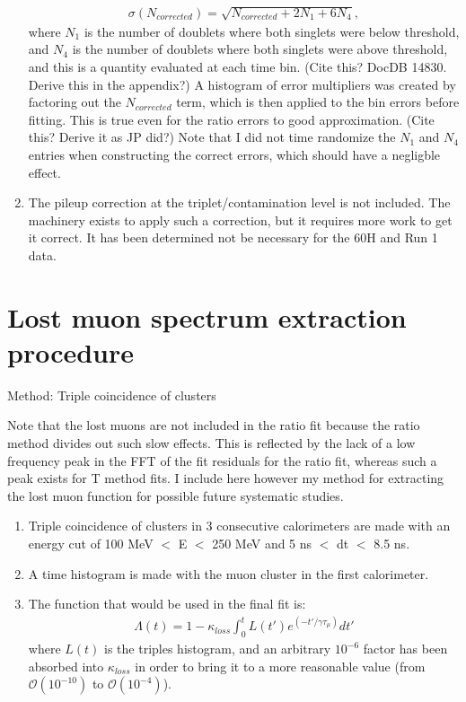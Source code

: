 \begin{enumerate}
{			\begin{gather}
				\sigma(N_{corrected}) = \sqrt{N_{corrected} + 2 N_{1} + 6 N_{4}},
			\end{gather}
		where $N_{1}$ is the number of doublets where both singlets were below threshold, and $N_{4}$ is the number of doublets where both singlets were above threshold, and this is a quantity evaluated at each time bin. (Cite this? DocDB 14830. Derive this in the appendix?) A histogram of error multipliers was created by factoring out the $N_{corrected}$ term, which is then applied to the bin errors before fitting. This is true even for the ratio errors to good approximation. (Cite this? Derive it as JP did?) Note that I did not time randomize the $N_{1}$ and $N_{4}$ entries when constructing the correct errors, which should have a negligble effect.}
		\item{The pileup correction at the triplet/contamination level is not included. The machinery exists to apply such a correction, but it requires more work to get it correct. It has been determined not be necessary for the 60H and Run 1 data.}
	\end{enumerate}


\section{Lost muon spectrum extraction procedure}
\label{Sec:LM}

	Method: Triple coincidence of clusters

	Note that the lost muons are not included in the ratio fit because the ratio method divides out such slow effects. This is reflected by the lack of a low frequency peak in the FFT of the fit residuals for the ratio fit, whereas such a peak exists for T method fits. I include here however my method for extracting the lost muon function for possible future systematic studies.

	\begin{enumerate}
		\item{Triple coincidence of clusters in 3 consecutive calorimeters are made with an energy cut of 100 MeV $<$ E $<$ 250 MeV and 5 ns $<$ dt $<$ 8.5 ns.}
		\item{A time histogram is made with the muon cluster in the first calorimeter.}
		\item{The function that would be used in the final fit is:
			\begin{gather}
				\Lambda(t) = 1 - \kappa_{loss} \int_{0}^{t} L(t')e^{(-t'/\gamma\tau_{\mu})} dt'
			\end{gather}
		where $L(t)$ is the triples histogram, and an arbitrary $10^{-6}$ factor has been absorbed into $\kappa_{loss}$ in order to bring it to a more reasonable value (from $\mathcal{O}(10^{-10})$ to $\mathcal{O}(10^{-4})$).}
	\end{enumerate}


